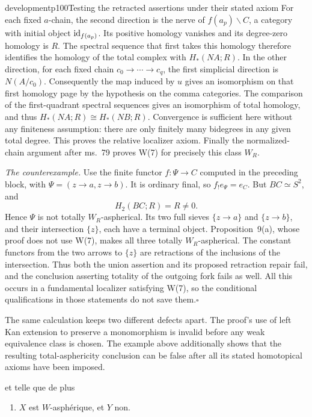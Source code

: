 \begin{dcomment}{development}{p100}{Testing the retracted assertions under their stated axiom}
For each fixed $a$-chain, the second direction is the nerve of $f(a_p)\backslash C$, a category with initial object $\mathrm{id}_{f(a_p)}$. Its positive homology vanishes and its degree-zero homology is $R$. The spectral sequence that first takes this homology therefore identifies the homology of the total complex with $H_*(NA;R)$. In the other direction, for each fixed chain $c_0\to\cdots\to c_q$, the first simplicial direction is $N(A/c_0)$. Consequently the map induced by $u$ gives an isomorphism on that first homology page by the hypothesis on the comma categories. The comparison of the first-quadrant spectral sequences gives an isomorphism of total homology, and thus $H_*(NA;R)\cong H_*(NB;R)$. Convergence is sufficient here without any finiteness assumption: there are only finitely many bidegrees in any given total degree. This proves the relative localizer axiom. Finally the normalized-chain argument after ms.~79 proves W(7) for precisely this class $W_R$.

\emph{The counterexample.} Use the finite functor $f:\Psi\to C$ computed in the preceding block, with $\Psi=(z\to a,z\to b)$. It is ordinary final, so $f_!e_\Psi=e_C$. But $BC\simeq S^2$, and
\[
 H_2(BC;R)=R\ne0.
\]
Hence $\Psi$ is not totally $W_R$-aspherical. Its two full sieves $\{z\to a\}$ and $\{z\to b\}$, and their intersection $\{z\}$, each have a terminal object. Proposition~9(a), whose proof does not use W(7), makes all three totally $W_R$-aspherical. The constant functors from the two arrows to $\{z\}$ are retractions of the inclusions of the intersection. Thus both the union assertion and its proposed retraction repair fail, and the conclusion asserting totality of the outgoing fork fails as well. All this occurs in a fundamental localizer satisfying W(7), so the conditional qualifications in those statements do not save them.\hfill$\square$

The same calculation keeps two different defects apart. The proof's use of left Kan extension to preserve a monomorphism is invalid before any weak equivalence class is chosen. The example above additionally shows that the resulting total-asphericity conclusion can be false after all its stated homotopical axioms have been imposed.
\end{dcomment}


et telle que de plus

\begin{enumerate}[label=\alph*), start=2]
\item $X$ est $W$-asphérique, et $Y$ non.
\end{enumerate}


